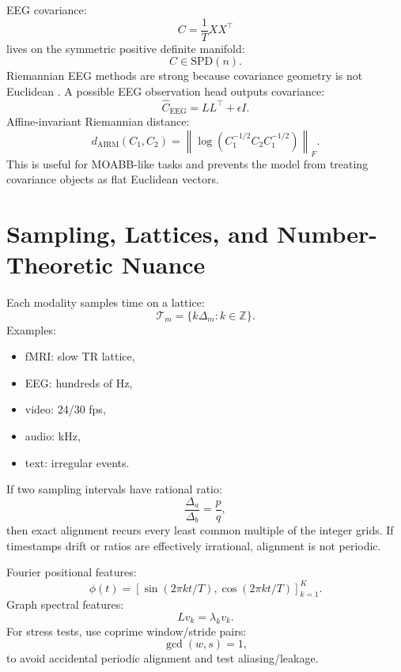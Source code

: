 \documentclass[11pt]{article}
\begin{document}
EEG covariance:
\begin{equation}
C=\frac{1}{T}XX^\top
\end{equation}
lives on the symmetric positive definite manifold:
\begin{equation}
C\in\mathrm{SPD}(n).
\end{equation}
Riemannian EEG methods are strong because covariance geometry is not Euclidean \cite{riemannian}. A possible EEG observation head outputs covariance:
\begin{equation}
\hat{C}_{\mathrm{EEG}}=LL^\top+\epsilon I.
\end{equation}
Affine-invariant Riemannian distance:
\begin{equation}
d_{\mathrm{AIRM}}(C_1,C_2)=\left\|\log(C_1^{-1/2}C_2C_1^{-1/2})\right\|_F.
\end{equation}
This is useful for MOABB-like tasks and prevents the model from treating covariance objects as flat Euclidean vectors.

\section{Sampling, Lattices, and Number-Theoretic Nuance}

Each modality samples time on a lattice:
\begin{equation}
\mathcal{T}_m=\{k\Delta_m:k\in\mathbb{Z}\}.
\end{equation}
Examples:
\begin{itemize}
\item fMRI: slow TR lattice,
\item EEG: hundreds of Hz,
\item video: 24/30 fps,
\item audio: kHz,
\item text: irregular events.
\end{itemize}
If two sampling intervals have rational ratio:
\begin{equation}
\frac{\Delta_a}{\Delta_b}=\frac{p}{q},
\end{equation}
then exact alignment recurs every least common multiple of the integer grids. If timestamps drift or ratios are effectively irrational, alignment is not periodic.

Fourier positional features:
\begin{equation}
\phi(t)=\left[\sin(2\pi kt/T),\cos(2\pi kt/T)\right]_{k=1}^K.
\end{equation}
Graph spectral features:
\begin{equation}
Lv_k=\lambda_kv_k.
\end{equation}
For stress tests, use coprime window/stride pairs:
\begin{equation}
\gcd(w,s)=1,
\end{equation}
to avoid accidental periodic alignment and test aliasing/leakage.
\end{document}
